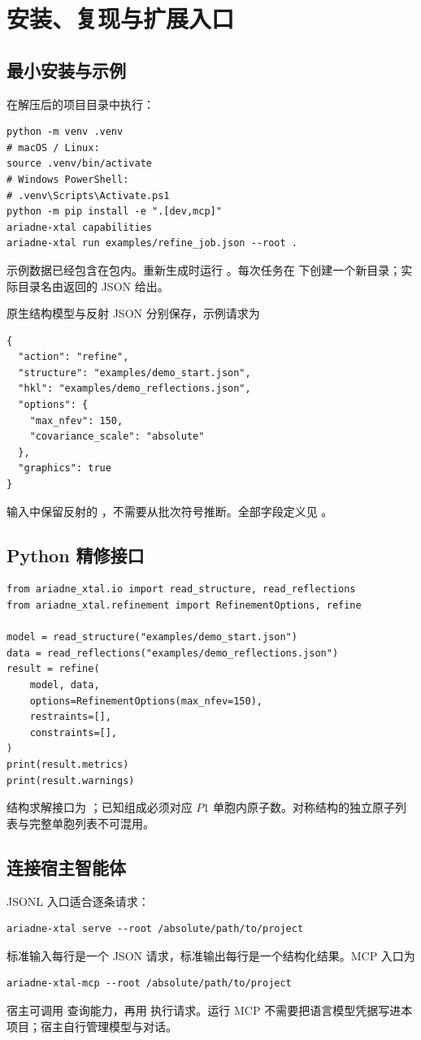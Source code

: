\chapter{安装、复现与扩展入口}
\section{最小安装与示例}
在解压后的项目目录中执行：
\begin{lstlisting}
python -m venv .venv
# macOS / Linux:
source .venv/bin/activate
# Windows PowerShell:
# .venv\Scripts\Activate.ps1
python -m pip install -e ".[dev,mcp]"
ariadne-xtal capabilities
ariadne-xtal run examples/refine_job.json --root .
\end{lstlisting}
示例数据已经包含在包内。重新生成时运行 。每次任务在  下创建一个新目录；实际目录名由返回的 JSON 给出。

原生结构模型与反射 JSON 分别保存，示例请求为
\begin{lstlisting}
{
  "action": "refine",
  "structure": "examples/demo_start.json",
  "hkl": "examples/demo_reflections.json",
  "options": {
    "max_nfev": 150,
    "covariance_scale": "absolute"
  },
  "graphics": true
}
\end{lstlisting}
输入中保留反射的 ，不需要从批次符号推断。全部字段定义见 。

\section{Python 精修接口}
\begin{lstlisting}
from ariadne_xtal.io import read_structure, read_reflections
from ariadne_xtal.refinement import RefinementOptions, refine

model = read_structure("examples/demo_start.json")
data = read_reflections("examples/demo_reflections.json")
result = refine(
    model, data,
    options=RefinementOptions(max_nfev=150),
    restraints=[],
    constraints=[],
)
print(result.metrics)
print(result.warnings)
\end{lstlisting}
结构求解接口为 ；已知组成必须对应 $P1$ 单胞内原子数。对称结构的独立原子列表与完整单胞列表不可混用。

\section{连接宿主智能体}
JSONL 入口适合逐条请求：
\begin{lstlisting}
ariadne-xtal serve --root /absolute/path/to/project
\end{lstlisting}
标准输入每行是一个 JSON 请求，标准输出每行是一个结构化结果。MCP 入口为
\begin{lstlisting}
ariadne-xtal-mcp --root /absolute/path/to/project
\end{lstlisting}
宿主可调用  查询能力，再用  执行请求。运行 MCP 不需要把语言模型凭据写进本项目；宿主自行管理模型与对话。

